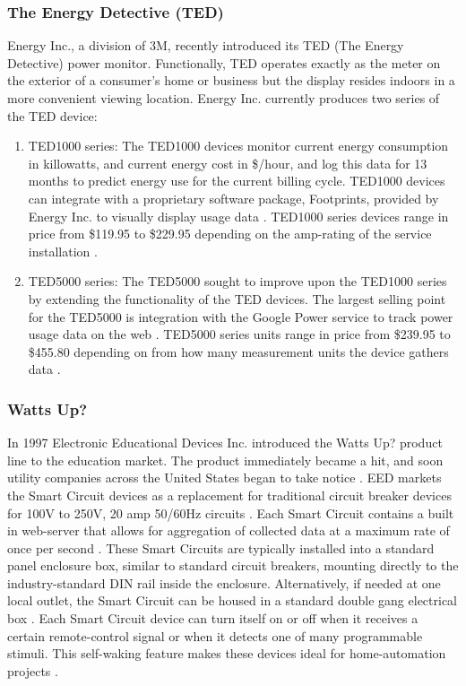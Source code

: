 \subsubsection{The Energy Detective (TED)} %
Energy Inc., a division of 3M, recently introduced its TED (The Energy Detective) power monitor. Functionally, TED operates exactly as the meter on the exterior of a consumer's home or business but the display resides indoors in a more convenient viewing location. Energy Inc. currently produces two series of the TED device:
\begin{enumerate}
\item TED1000 series: The TED1000 devices monitor current energy consumption in killowatts, and current energy cost in \$/hour, and log this data for 13 months to predict energy use for the current billing cycle. TED1000 devices can integrate with a proprietary software package, Footprints, provided by Energy Inc. to visually display usage data \cite{TED1000}. TED1000 series devices range in price from \$119.95 to \$229.95 depending on the amp-rating of the service installation \cite{TED1000Store}.
\item TED5000 series: The TED5000 sought to improve upon the TED1000 series by extending the functionality of the TED devices. The largest selling point for the TED5000 is integration with the Google Power service to track power usage data on the web \cite{TED5000}. TED5000 series units range in price from \$239.95 to \$455.80 depending on from how many measurement units the device gathers data \cite{TED5000Store}.
\end{enumerate}

\subsubsection{Watts Up?}%
In 1997 Electronic Educational Devices Inc. introduced the Watts Up? product line to the education market. The product immediately became a hit, and soon utility companies across the United States began to take notice \cite{WattsAbout}. EED markets the Smart Circuit devices as a replacement for traditional circuit breaker devices for 100V to 250V, 20 amp 50/60Hz circuits \cite{WattsUpDatasheet}. Each Smart Circuit contains a built in web-server that allows for aggregation of collected data at a maximum rate of once per second \cite{WattsUpDatasheet}. These Smart Circuits are typically installed into a standard panel enclosure box, similar to standard circuit breakers, mounting directly to the industry-standard DIN rail inside the enclosure\cite{WattsUpDatasheet}. Alternatively, if needed at one local outlet, the Smart Circuit can be housed in a standard double gang electrical box \cite{WattsUpDatasheet}. Each Smart Circuit device can turn itself on or off when it receives a certain remote-control signal or when it detects one of many programmable stimuli. This self-waking feature makes these devices ideal for home-automation projects \cite{WattsUpDatasheet}.


